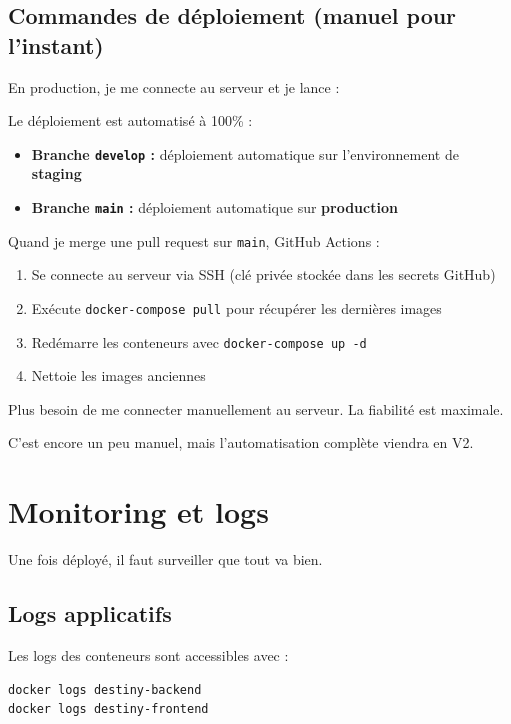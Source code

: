 \subsection{Commandes de déploiement (manuel pour l'instant)}

En production, je me connecte au serveur et je lance :

Le déploiement est automatisé à 100\% :

\begin{itemize}
    \item \textbf{Branche \texttt{develop} :} déploiement automatique sur l'environnement de \textbf{staging}
    \item \textbf{Branche \texttt{main} :} déploiement automatique sur \textbf{production}
\end{itemize}

Quand je merge une pull request sur \texttt{main}, GitHub Actions :
\begin{enumerate}
    \item Se connecte au serveur via SSH (clé privée stockée dans les secrets GitHub)
    \item Exécute \texttt{docker-compose pull} pour récupérer les dernières images
    \item Redémarre les conteneurs avec \texttt{docker-compose up -d}
    \item Nettoie les images anciennes
\end{enumerate}

Plus besoin de me connecter manuellement au serveur. La fiabilité est maximale.

C'est encore un peu manuel, mais l'automatisation complète viendra en V2.

\section{Monitoring et logs}

Une fois déployé, il faut surveiller que tout va bien.

\subsection{Logs applicatifs}

Les logs des conteneurs sont accessibles avec :

\begin{verbatim}
docker logs destiny-backend
docker logs destiny-frontend
\end{verbatim}

